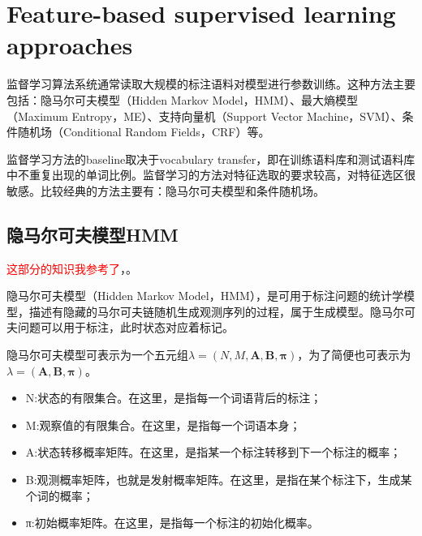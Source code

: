 \documentclass[a4paper,UTF8,no-math]{ctexart}
\begin{document}
	
	\section{Feature-based supervised learning approaches}
	
	监督学习算法系统通常读取大规模的标注语料对模型进行参数训练。这种方法主要包括：隐马尔可夫模型（Hidden Markov Model，HMM）、最大熵模型（Maximum Entropy，ME）、支持向量机（Support Vector Machine，SVM）、条件随机场（Conditional Random Fields，CRF）等。
	
	监督学习方法的baseline取决于vocabulary transfer，即在训练语料库和测试语料库中不重复出现的单词比例。监督学习的方法对特征选取的要求较高，对特征选区很敏感。比较经典的方法主要有：隐马尔可夫模型和条件随机场。
	
	\subsection{隐马尔可夫模型HMM}
	
	
	
	\textcolor{red}{这部分的知识我参考了}\citep{李航2012统计学习方法}，\citep{宗成庆2013统计自然语言处理}。

	
	隐马尔可夫模型（Hidden Markov Model，HMM），是可用于标注问题的统计学模型，描述有隐藏的马尔可夫链随机生成观测序列的过程，属于生成模型。隐马尔可夫问题可以用于标注，此时状态对应着标记。
	
	
	
	隐马尔可夫模型可表示为一个五元组$\lambda=(N,M,\mathbf{A}, \mathbf{B}, \mathbf{\pi})$，为了简便也可表示为$\lambda=(\mathbf{A}, \mathbf{B}, \mathbf{\pi})$。
	
	
	
	\begin{itemize}
		\item N:状态的有限集合。在这里，是指每一个词语背后的标注；
		\item M:观察值的有限集合。在这里，是指每一个词语本身；
		\item A:状态转移概率矩阵。在这里，是指某一个标注转移到下一个标注的概率；
		\item B:观测概率矩阵，也就是发射概率矩阵。在这里，是指在某个标注下，生成某个词的概率；
		\item π:初始概率矩阵。在这里，是指每一个标注的初始化概率。
	\end{itemize}
	
\end{document}
